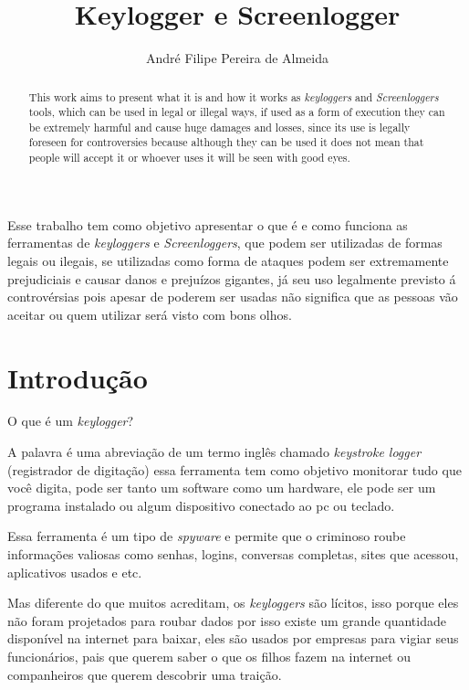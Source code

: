 \documentclass[12pt]{article}
\title{Keylogger e Screenlogger}
\author{André Filipe Pereira de Almeida}
\begin{document}
 

\maketitle

\begin{abstract}
  This work aims to present what it is and how it works as \textit{keyloggers} and \textit {Screenloggers} tools, which can be used in legal or illegal ways, if used as a form of execution they can be extremely harmful and cause huge damages and losses, since its use is legally foreseen for controversies because although they can be used it does not mean that people will accept it or whoever uses it will be seen with good eyes.
\end{abstract}
     
\begin{resumo} 
  Esse trabalho tem como objetivo apresentar o que é e como funciona as ferramentas de \textit{keyloggers} e \textit{Screenloggers}, que podem ser utilizadas de formas legais ou ilegais, se utilizadas como forma de ataques podem ser extremamente prejudiciais e causar danos e prejuízos gigantes, já seu uso legalmente previsto á controvérsias pois apesar de poderem ser usadas não significa que as pessoas vão aceitar ou quem utilizar será visto com bons olhos.   
\end{resumo}


\section{Introdução}
O que é um \textit{keylogger}?

A palavra é uma abreviação de um termo inglês chamado \textit{keystroke logger} (registrador de digitação) essa ferramenta tem como objetivo monitorar tudo que você digita, pode ser tanto um software como um hardware, ele pode ser um programa instalado ou algum dispositivo conectado ao pc ou teclado.

Essa ferramenta é um tipo de \textit{spyware} e permite que o criminoso roube informações valiosas como senhas, logins, conversas completas, sites que acessou, aplicativos usados e etc.

Mas diferente do que muitos acreditam, os \textit{keyloggers} são lícitos, isso porque eles não foram projetados para roubar dados por isso existe um grande quantidade disponível na internet para baixar, eles são usados por empresas para vigiar seus funcionários, pais que querem saber o que os filhos fazem na internet ou companheiros que querem descobrir uma traição.
\end{document}

